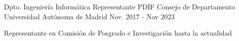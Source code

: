 


\begin{cventries}
  \cventry
    {Dpto. Ingeniería Informática} %
    {Representante PDIF Consejo de Departamento} %
    {Universidad Autónoma de Madrid} %
    {Nov. 2017 - Nov 2023} %
    { \begin{cvitems} %
      	\item {Representante en Comisión de Posgrado e Investigación hasta la actualidad}
      \end{cvitems}
    }
\end{cventries}


